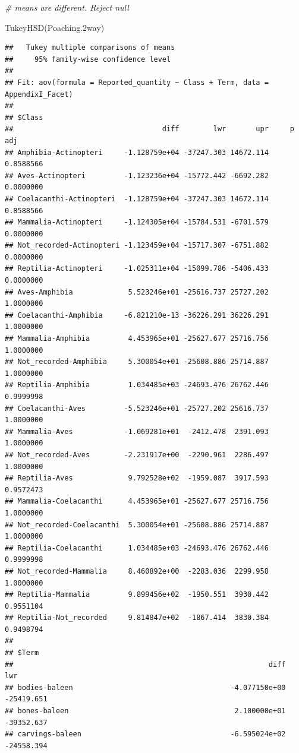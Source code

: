 \documentclass[
  12pt,
]{article}
\newenvironment{Shaded}{\begin{snugshade}}{\end{snugshade}}
\newcommand{\CommentTok}[1]{\textcolor[rgb]{0.56,0.35,0.01}{\textit{#1}}}
\newcommand{\FloatTok}[1]{\textcolor[rgb]{0.00,0.00,0.81}{#1}}
\newcommand{\FunctionTok}[1]{\textcolor[rgb]{0.00,0.00,0.00}{#1}}
\newcommand{\NormalTok}[1]{#1}
\begin{document}
\begin{Shaded}
\begin{Highlighting}[]
\CommentTok{\# means are different. Reject null}

\FunctionTok{TukeyHSD}\NormalTok{(Poaching}\FloatTok{.2}\NormalTok{way)}
\end{Highlighting}
\end{Shaded}

\begin{verbatim}
##   Tukey multiple comparisons of means
##     95% family-wise confidence level
## 
## Fit: aov(formula = Reported_quantity ~ Class + Term, data = AppendixI_Facet)
## 
## $Class
##                                   diff        lwr       upr     p adj
## Amphibia-Actinopteri     -1.128759e+04 -37247.303 14672.114 0.8588566
## Aves-Actinopteri         -1.123236e+04 -15772.442 -6692.282 0.0000000
## Coelacanthi-Actinopteri  -1.128759e+04 -37247.303 14672.114 0.8588566
## Mammalia-Actinopteri     -1.124305e+04 -15784.531 -6701.579 0.0000000
## Not_recorded-Actinopteri -1.123459e+04 -15717.307 -6751.882 0.0000000
## Reptilia-Actinopteri     -1.025311e+04 -15099.786 -5406.433 0.0000000
## Aves-Amphibia             5.523246e+01 -25616.737 25727.202 1.0000000
## Coelacanthi-Amphibia     -6.821210e-13 -36226.291 36226.291 1.0000000
## Mammalia-Amphibia         4.453965e+01 -25627.677 25716.756 1.0000000
## Not_recorded-Amphibia     5.300054e+01 -25608.886 25714.887 1.0000000
## Reptilia-Amphibia         1.034485e+03 -24693.476 26762.446 0.9999998
## Coelacanthi-Aves         -5.523246e+01 -25727.202 25616.737 1.0000000
## Mammalia-Aves            -1.069281e+01  -2412.478  2391.093 1.0000000
## Not_recorded-Aves        -2.231917e+00  -2290.961  2286.497 1.0000000
## Reptilia-Aves             9.792528e+02  -1959.087  3917.593 0.9572473
## Mammalia-Coelacanthi      4.453965e+01 -25627.677 25716.756 1.0000000
## Not_recorded-Coelacanthi  5.300054e+01 -25608.886 25714.887 1.0000000
## Reptilia-Coelacanthi      1.034485e+03 -24693.476 26762.446 0.9999998
## Not_recorded-Mammalia     8.460892e+00  -2283.036  2299.958 1.0000000
## Reptilia-Mammalia         9.899456e+02  -1950.551  3930.442 0.9551104
## Reptilia-Not_recorded     9.814847e+02  -1867.414  3830.384 0.9498794
## 
## $Term
##                                                            diff         lwr
## bodies-baleen                                     -4.077150e+00  -25419.651
## bones-baleen                                       2.100000e+01  -39352.637
## carvings-baleen                                   -6.595024e+02  -24558.394

\end{verbatim}
\end{document}
